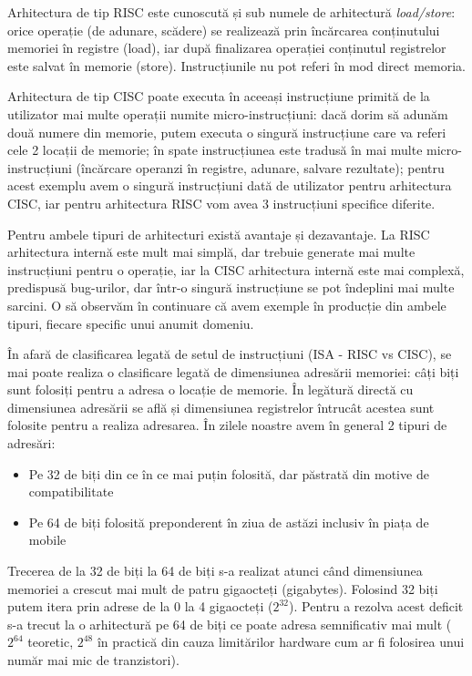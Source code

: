 Arhitectura de tip RISC este cunoscută și sub numele de arhitectură
\textit{load/store}:
orice operație (de adunare, scădere) se realizează prin încărcarea conținutului
memoriei în registre (load), iar după finalizarea operației conținutul
registrelor este salvat în memorie (store). Instrucțiunile nu pot referi în mod
direct memoria.

Arhitectura de tip CISC poate executa în aceeași instrucțiune primită de la
utilizator mai multe operații numite micro-instrucțiuni: dacă dorim să adunăm
două numere din memorie, putem executa o singură instrucțiune care va referi
cele 2 locații de memorie; în spate instrucțiunea este tradusă în mai multe
micro-instrucțiuni (încărcare operanzi în registre, adunare, salvare rezultate);
pentru acest exemplu avem o singură instrucțiuni dată de utilizator pentru
arhitectura CISC, iar pentru arhitectura RISC vom avea 3 instrucțiuni specifice
diferite.

Pentru ambele tipuri de arhitecturi există avantaje și dezavantaje. La RISC
arhitectura internă este mult mai simplă, dar trebuie generate mai multe
instrucțiuni pentru o operație, iar la CISC arhitectura internă este mai
complexă, predispusă bug-urilor, dar într-o singură instrucțiune se pot
îndeplini mai multe sarcini. O să observăm în continuare că avem exemple în
producție din ambele tipuri, fiecare specific unui anumit domeniu.

În afară de clasificarea legată de setul de instrucțiuni (ISA - RISC vs CISC),
se mai poate realiza o clasificare legată de dimensiunea adresării memoriei:
câți biți sunt folosiți pentru a adresa o locație de memorie. În legătură
directă cu dimensiunea adresării se află și dimensiunea registrelor întrucât
acestea sunt folosite pentru a realiza adresarea. În zilele noastre avem în
general 2 tipuri de adresări:

\begin{itemize}
	\item Pe 32 de biți din ce în ce mai puțin folosită, dar păstrată din
		motive de compatibilitate
	\item Pe 64 de biți folosită preponderent în ziua de astăzi inclusiv în
		piața de mobile
\end{itemize}

Trecerea de la 32 de biți la 64 de biți s-a realizat atunci când dimensiunea
memoriei a crescut mai mult de patru gigaocteți (gigabytes). Folosind 32 biți
putem itera prin adrese de la 0 la 4 gigaocteți ($2^{32}$). Pentru a rezolva
acest deficit s-a trecut la o arhitectură pe 64 de biți ce poate adresa
semnificativ mai mult ($2^{64}$ teoretic, $2^{48}$ în practică din cauza
limitărilor hardware cum ar fi folosirea unui număr mai mic de tranzistori).

